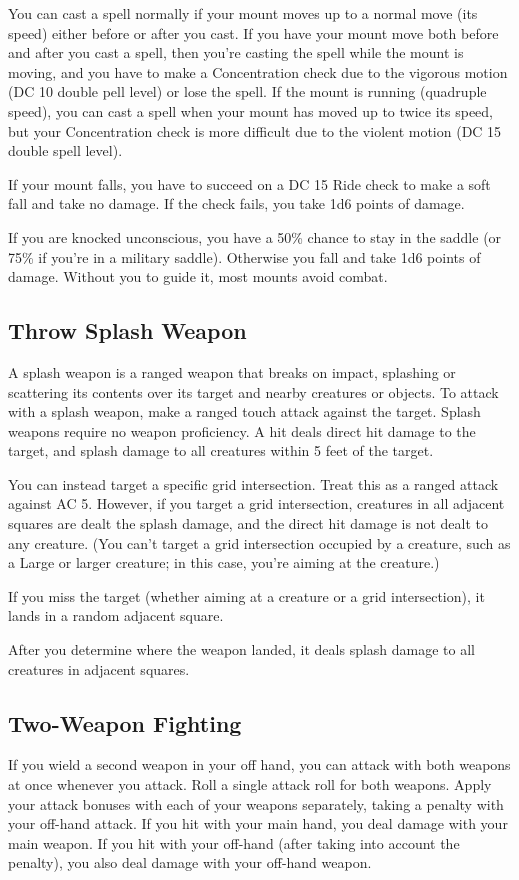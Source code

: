  You can cast a spell normally if your mount moves up to a normal move (its speed) either before or after you cast. If you have your mount move both before and after you cast a spell, then you're casting the spell while the mount is moving, and you have to make a Concentration check due to the vigorous motion (DC 10 \add double pell level) or lose the spell. If the mount is running (quadruple speed), you can cast a spell when your mount has moved up to twice its speed, but your Concentration check is more difficult due to the violent motion (DC 15 \add double spell level).

 If your mount falls, you have to succeed on a DC 15 Ride check to make a soft fall and take no damage. If the check fails, you take 1d6 points of damage.

 If you are knocked unconscious, you have a 50\% chance to stay in the saddle (or 75\% if you're in a military saddle). Otherwise you fall and take 1d6 points of damage. Without you to guide it, most mounts avoid combat.

\subsection{Throw Splash Weapon}
A splash weapon is a ranged weapon that breaks on impact, splashing or scattering its contents over its target and nearby creatures or objects. To attack with a splash weapon, make a ranged touch attack against the target. Splash weapons require no weapon proficiency. A hit deals direct hit damage to the target, and splash damage to all creatures within 5 feet of the target.

You can instead target a specific grid intersection. Treat this as a ranged attack against AC 5. However, if you target a grid intersection, creatures in all adjacent squares are dealt the splash damage, and the direct hit damage is not dealt to any creature. (You can't target a grid intersection occupied by a creature, such as a Large or larger creature; in this case, you're aiming at the creature.)

If you miss the target (whether aiming at a creature or a grid intersection), it lands in a random adjacent square.

After you determine where the weapon landed, it deals splash damage to all creatures in adjacent squares.

\subsection{Two-Weapon Fighting}
If you wield a second weapon in your off hand, you can attack with both weapons at once whenever you attack. Roll a single attack roll for both weapons. Apply your attack bonuses with each of your weapons separately, taking a  penalty with your off-hand attack. If you hit with your main hand, you deal damage with your main weapon. If you hit with your off-hand (after taking into account the  penalty), you also deal damage with your off-hand weapon.

